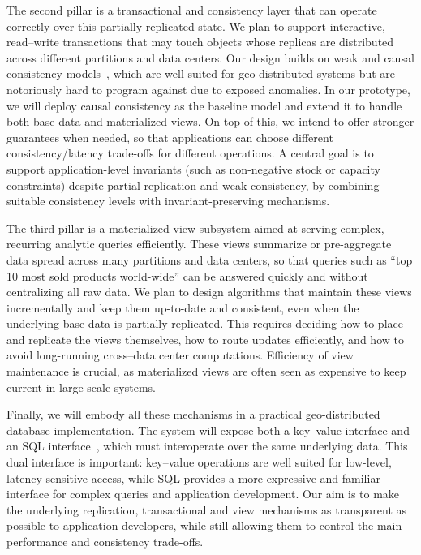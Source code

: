 The second pillar is a transactional and consistency layer that can operate correctly over this partially replicated state.
We plan to support interactive, read–write transactions that may touch objects whose replicas are distributed across different partitions and data centers.
Our design builds on weak and causal consistency models~\cite{dynamo, cops, walter, understandingEC, cure, saturn}, which are well suited for geo-distributed systems but are notoriously hard to program against due to exposed anomalies.
In our prototype, we will deploy causal consistency as the baseline model and extend it to handle both base data and materialized views.
On top of this, we intend to offer stronger guarantees when needed, so that applications can choose different consistency/latency trade-offs for different operations.
A central goal is to support application-level invariants (such as non-negative stock or capacity constraints) despite partial replication and weak consistency, by combining suitable consistency levels with invariant-preserving mechanisms.

The third pillar is a materialized view subsystem aimed at serving complex, recurring analytic queries efficiently.
These views summarize or pre-aggregate data spread across many partitions and data centers, so that queries such as ``top 10 most sold products world-wide'' can be answered quickly and without centralizing all raw data.
We plan to design algorithms that maintain these views incrementally and keep them up-to-date and consistent, even when the underlying base data is partially replicated.
This requires deciding how to place and replicate the views themselves, how to route updates efficiently, and how to avoid long-running cross–data center computations.
Efficiency of view maintenance is crucial, as materialized views are often seen as expensive to keep current in large-scale systems.

Finally, we will embody all these mechanisms in a practical geo-distributed database implementation.
The system will expose both a key–value interface and an SQL interface~\cite{sequel}, which must interoperate over the same underlying data.
This dual interface is important: key–value operations are well suited for low-level, latency-sensitive access, while SQL provides a more expressive and familiar interface for complex queries and application development.
Our aim is to make the underlying replication, transactional and view mechanisms as transparent as possible to application developers, while still allowing them to control the main performance and consistency trade-offs.

